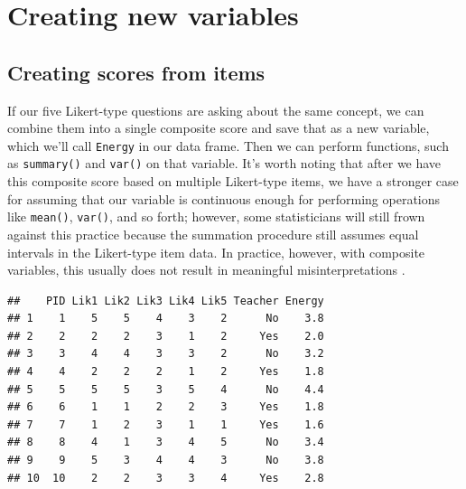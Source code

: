 \documentclass[
]{article}
\newenvironment{Shaded}{\begin{snugshade}}{\end{snugshade}}
\newcommand{\CommentTok}[1]{\textcolor[rgb]{0.56,0.35,0.01}{\textit{#1}}}
\newcommand{\DataTypeTok}[1]{\textcolor[rgb]{0.13,0.29,0.53}{#1}}
\newcommand{\DecValTok}[1]{\textcolor[rgb]{0.00,0.00,0.81}{#1}}
\newcommand{\KeywordTok}[1]{\textcolor[rgb]{0.13,0.29,0.53}{\textbf{#1}}}
\newcommand{\NormalTok}[1]{#1}
\newcommand{\OperatorTok}[1]{\textcolor[rgb]{0.81,0.36,0.00}{\textbf{#1}}}
\newcommand{\StringTok}[1]{\textcolor[rgb]{0.31,0.60,0.02}{#1}}
\begin{document}
\hypertarget{appending}{%
\section{Creating new variables}\label{appending}}

\hypertarget{creating-scores-from-items}{%
\subsection{Creating scores from items}\label{creating-scores-from-items}}

If our five Likert-type questions are asking about the same concept, we can combine them into a single composite score and save that as a new variable, which we'll call \texttt{Energy} in our data frame. Then we can perform functions, such as \texttt{summary()} and \texttt{var()} on that variable. It's worth noting that after we have this composite score based on multiple Likert-type items, we have a stronger case for assuming that our variable is continuous enough for performing operations like \texttt{mean()}, \texttt{var()}, and so forth; however, some statisticians will still frown against this practice because the summation procedure still assumes equal intervals in the Likert-type item data. In practice, however, with composite variables, this usually does not result in meaningful misinterpretations \citep{carifio_resolving_2008, norman_likert_2010}.

\begin{Shaded}
\end{Shaded}

\begin{verbatim}
##    PID Lik1 Lik2 Lik3 Lik4 Lik5 Teacher Energy
## 1    1    5    5    4    3    2      No    3.8
## 2    2    2    2    3    1    2     Yes    2.0
## 3    3    4    4    3    3    2      No    3.2
## 4    4    2    2    2    1    2     Yes    1.8
## 5    5    5    5    3    5    4      No    4.4
## 6    6    1    1    2    2    3     Yes    1.8
## 7    7    1    2    3    1    1     Yes    1.6
## 8    8    4    1    3    4    5      No    3.4
## 9    9    5    3    4    4    3      No    3.8
## 10  10    2    2    3    3    4     Yes    2.8
\end{verbatim}
\end{document}
